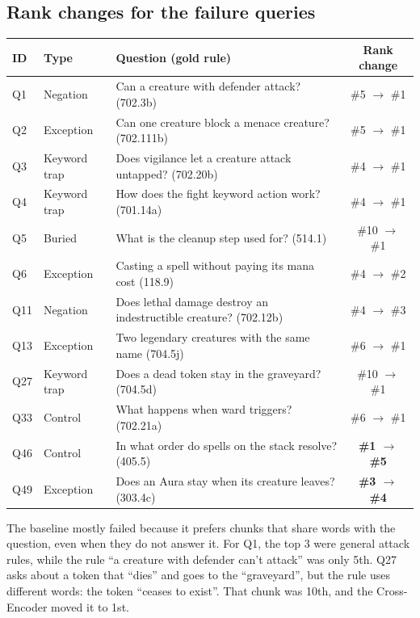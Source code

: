 \documentclass[11pt,a4paper]{article}
\newcommand{\ra}{$\rightarrow$}
\begin{document}
\subsection{Rank changes for the failure queries}
\begin{center}
\small
\begin{tabularx}{\linewidth}{llLc}
\toprule
ID & Type & Question (gold rule) & Rank change \\
\midrule
Q1  & Negation     & Can a creature with defender attack? (702.3b) & \#5 \ra{} \#1 \\
Q2  & Exception    & Can one creature block a menace creature? (702.111b) & \#5 \ra{} \#1 \\
Q3  & Keyword trap & Does vigilance let a creature attack untapped? (702.20b) & \#4 \ra{} \#1 \\
Q4  & Keyword trap & How does the fight keyword action work? (701.14a) & \#4 \ra{} \#1 \\
Q5  & Buried       & What is the cleanup step used for? (514.1) & \#10 \ra{} \#1 \\
Q6  & Exception    & Casting a spell without paying its mana cost (118.9) & \#4 \ra{} \#2 \\
Q11 & Negation     & Does lethal damage destroy an indestructible creature? (702.12b) & \#4 \ra{} \#3 \\
Q13 & Exception    & Two legendary creatures with the same name (704.5j) & \#6 \ra{} \#1 \\
Q27 & Keyword trap & Does a dead token stay in the graveyard? (704.5d) & \#10 \ra{} \#1 \\
Q33 & Control      & What happens when ward triggers? (702.21a) & \#6 \ra{} \#1 \\
Q46 & Control      & In what order do spells on the stack resolve? (405.5) & \textbf{\#1 \ra{} \#5} \\
Q49 & Exception    & Does an Aura stay when its creature leaves? (303.4c) & \textbf{\#3 \ra{} \#4} \\
\bottomrule
\end{tabularx}
\end{center}

The baseline mostly failed because it prefers chunks that share words with the question, even when they do not answer it. For Q1, the top 3 were general attack rules, while the rule ``a creature with defender can't attack'' was only 5th. Q27 asks about a token that ``dies'' and goes to the ``graveyard'', but the rule uses different words: the token ``ceases to exist''. That chunk was 10th, and the Cross-Encoder moved it to 1st.
\end{document}

